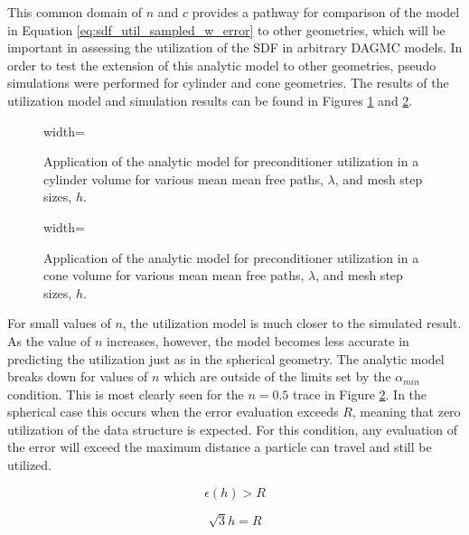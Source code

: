 This common domain of $n$ and $c$ provides a pathway for comparison of the
model in Equation \eqref{eq:sdf_util_sampled_w_error} to other geometries, which
will be important in assessing the utilization of the SDF in arbitrary DAGMC
models. In order to test the extension of this analytic model to other
geometries, pseudo simulations were performed for cylinder and cone
geometries. The results of the utilization model and simulation results can be
found in Figures \ref{fig:sdf_util_sampled_cylinder} and
\ref{fig:sdf_util_sampled_cone}.

\begin{figure}[H]
  \centering
  {width=\textwidth}
  \caption[Application of the utilization model for a cylinder
    geometry.]{Application of the analytic model for preconditioner utilization
    in a cylinder volume for various mean mean free paths, $\lambda$, and mesh
    step sizes, $h$.}
  \label{fig:sdf_util_sampled_cylinder}
\end{figure}


\begin{figure}[H]
  \centering
  {width=\textwidth}
  \caption[Application of the utilization model for a conic
    geometry.]{Application of the analytic model for preconditioner utilization
    in a cone volume for various mean mean free paths, $\lambda$, and mesh step
    sizes, $h$.}
  \label{fig:sdf_util_sampled_cone}
\end{figure}

For small values of $n$, the utilization model is much closer to the simulated
result. As the value of $n$ increases, however, the model becomes less accurate
in predicting the utilization just as in the spherical geometry. The analytic
model breaks down for values of $n$ which are outside of the limits set by the
$\alpha_{min}$ condition. This is most clearly seen for the $n = 0.5$ trace in
Figure \ref{fig:sdf_util_sampled_cone}. In the spherical case this occurs when
the error evaluation exceeds $R$, meaning that zero utilization of the data
structure is expected. For this condition, any evaluation of the error will
exceed the maximum distance a particle can travel and still be utilized.

\begin{equation}
  \epsilon(h) > R
\end{equation}

\begin{equation}
  \sqrt{3}h = R
\end{equation}


